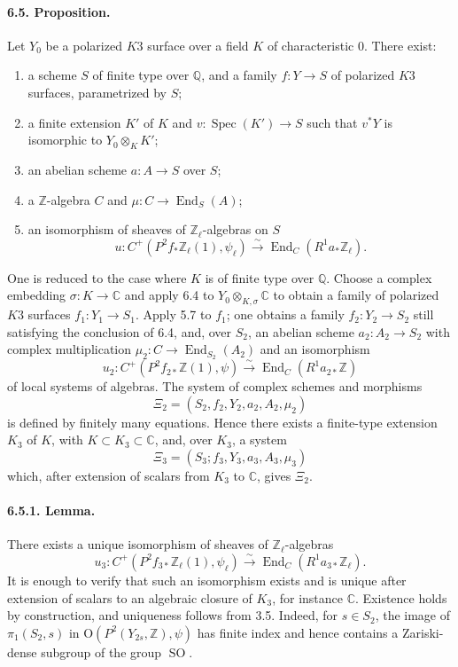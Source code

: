 \documentclass[10pt]{article}
\newcommand{\C}{\mathbb{C}}
\newcommand{\Q}{\mathbb{Q}}
\newcommand{\Z}{\mathbb{Z}}
\newcommand{\Spec}{\operatorname{Spec}}
\newcommand{\End}{\operatorname{End}}
\newcommand{\SO}{\operatorname{SO}}
\newcommand{\iso}{\xrightarrow{\sim}}
\begin{document}
\paragraph{6.5. Proposition.} Let $Y_0$ be a polarized $K3$ surface over a field $K$ of characteristic $0$. There exist:
\begin{enumerate}[label=\alph*)]
\item a scheme $S$ of finite type over $\Q$, and a family $f:Y\to S$ of polarized $K3$ surfaces, parametrized by $S$;
\item a finite extension $K'$ of $K$ and $v:\Spec(K')\to S$ such that $v^*Y$ is isomorphic to $Y_0\otimes_KK'$;
\item an abelian scheme $a:A\to S$ over $S$;
\item a $\Z$-algebra $C$ and $\mu:C\to\End_S(A)$;
\item an isomorphism of sheaves of $\Z_\ell$-algebras on $S$
\[
u:C^+(P^2f_*\Z_\ell(1),\psi_\ell)\iso \End_C(R^1a_*\Z_\ell).
\]
\end{enumerate}

One is reduced to the case where $K$ is of finite type over $\Q$. Choose a complex embedding $\sigma:K\to\C$ and apply 6.4 to $Y_0\otimes_{K,\sigma}\C$ to obtain a family of polarized $K3$ surfaces $f_1:Y_1\to S_1$. Apply 5.7 to $f_1$; one obtains a family $f_2:Y_2\to S_2$ still satisfying the conclusion of 6.4, and, over $S_2$, an abelian scheme $a_2:A_2\to S_2$ with complex multiplication $\mu_2:C\to\End_{S_2}(A_2)$ and an isomorphism
\[
u_2:C^+(P^2f_{2*}\Z(1),\psi)\iso \End_C(R^1a_{2*}\Z)
\]
of local systems of algebras. The system of complex schemes and morphisms
\[
\Xi_2=(S_2,f_2,Y_2,a_2,A_2,\mu_2)
\]
is defined by finitely many equations. Hence there exists a finite-type extension $K_3$ of $K$, with $K\subset K_3\subset\C$, and, over $K_3$, a system
\[
\Xi_3=(S_3;f_3,Y_3,a_3,A_3,\mu_3)
\]
which, after extension of scalars from $K_3$ to $\C$, gives $\Xi_2$.

\paragraph{6.5.1. Lemma.} There exists a unique isomorphism of sheaves of $\Z_\ell$-algebras
\[
u_3:C^+(P^2f_{3*}\Z_\ell(1),\psi_\ell)\iso
\End_C(R^1a_{3*}\Z_\ell).
\]
It is enough to verify that such an isomorphism exists and is unique after extension of scalars to an algebraic closure of $K_3$, for instance $\C$. Existence holds by construction, and uniqueness follows from 3.5. Indeed, for $s\in S_2$, the image of $\pi_1(S_2,s)$ in $\mathrm O(P^2(Y_{2s},\Z),\psi)$ has finite index and hence contains a Zariski-dense subgroup of the group $\SO$.
\end{document}
